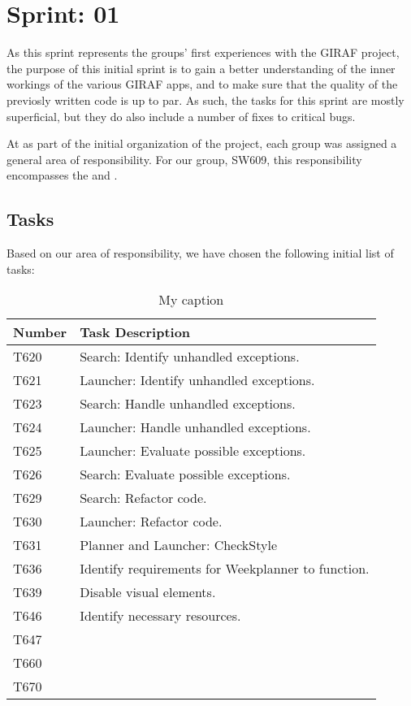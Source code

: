 \chapter{Sprint: 01}
As this sprint represents the groups' first experiences with the GIRAF
project, the purpose of this initial sprint is to gain a better understanding of
the inner workings of the various GIRAF apps, and to make sure that the quality
of the previosly written code is up to par. As such, the tasks for this sprint
are mostly superficial, but they do also include a number of fixes to critical
bugs.\nl

At as part of the initial organization of the project, each group was assigned a
general area of responsibility. For our group, SW609, this responsibility
encompasses the  and .

\section{Tasks}
Based on our area of responsibility, we have chosen the following initial list
of tasks:

\begin{table}[H]
\centering
\label{S01:Tasks}
\begin{tabular}{|l|l|}
\hline
Number 			& Task Description 								\\ \hline
T620  			& Search: Identify unhandled exceptions.                 \\ \hline
T621    	   	& Launcher: Identify unhandled exceptions. \\\hline 
T623	       	& Search: Handle unhandled exceptions.                 								\\\hline
T624    	   	& Launcher: Handle unhandled exceptions.  \\ \hline
T625   	   		& Launcher: Evaluate possible exceptions.        \\ \hline
T626   	   		& Search: Evaluate possible exceptions.                \\ \hline
T629  	   		& Search: Refactor code.			   \\ \hline
T630       		& Launcher: Refactor code.                 \\ \hline
T631       		& Planner and Launcher: CheckStyle                 \\ \hline
T636       		& Identify requirements for Weekplanner to function.   \\\hline 
T639       		& Disable visual elements.                 \\ \hline
T646       		& Identify necessary resources.                 \\ \hline
T647       		&                  \\ \hline
T660       		&                  \\ \hline
T670       		&                  \\ \hline
\end{tabular}
\caption{My caption}
\end{table}







